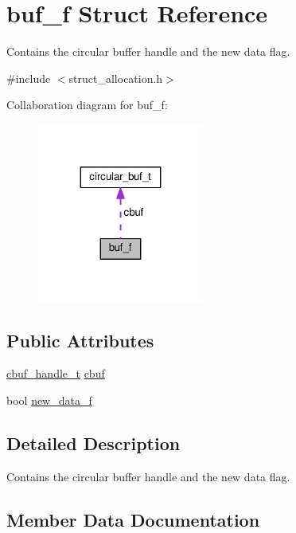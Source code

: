 \hypertarget{structbuf__f}{}\section{buf\+\_\+f Struct Reference}
\label{structbuf__f}


Contains the circular buffer handle and the new data flag.  




{\ttfamily \#include $<$struct\+\_\+allocation.\+h$>$}



Collaboration diagram for buf\+\_\+f\+:\nopagebreak
\begin{figure}[H]
\begin{center}
\leavevmode
\includegraphics[width=155pt]{structbuf__f__coll__graph}
\end{center}
\end{figure}
\subsection*{Public Attributes}
\begin{DoxyCompactItemize}
\item 
\hyperlink{structcircular__buf__t}{cbuf\+\_\+handle\+\_\+t} \hyperlink{structbuf__f_acd7ea2dab3453e8ef84165772ff427fe}{cbuf}
\item 
bool \hyperlink{structbuf__f_afddc498a46f464e3c5caf135b1ff0dce}{new\+\_\+data\+\_\+f}
\end{DoxyCompactItemize}


\subsection{Detailed Description}
Contains the circular buffer handle and the new data flag. 

\subsection{Member Data Documentation}
